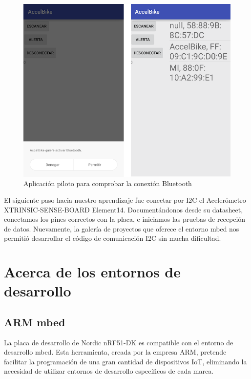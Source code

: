 \begin{figure}[h]%
	\centering 	
    \includegraphics[scale=0.8]{figures/app_piloto2.PNG} %
   	\caption[Aplicación piloto para comprobar la conexión Bluetooth]{Aplicación piloto para comprobar la conexión Bluetooth}
   	\label{figuraAPPPrueba}
\end{figure}

El siguiente paso hacia nuestro aprendizaje fue conectar por I2C el Acelerómetro XTRINSIC-SENSE-BOARD Element14. Documentándonos desde su datasheet, conectamos los pines correctos con la placa, e iniciamos las pruebas de recepción de datos.
Nuevamente, la galería de proyectos que oferece el entorno mbed nos permitió desarrollar el código de comunicación I2C sin mucha dificultad.


\section{Acerca de los entornos de desarrollo}
\label{makereference4.2}

\subsection{ARM mbed}
\label{explicacionARMmbed}

La placa de desarrollo de Nordic nRF51-DK es compatible con el entorno de desarrollo mbed. Esta herramienta, creada por la empresa ARM, pretende facilitar la programación de una gran cantidad de dispositivos IoT, eliminando la necesidad de utilizar entornos de desarrollo específicos de cada marca.\\

